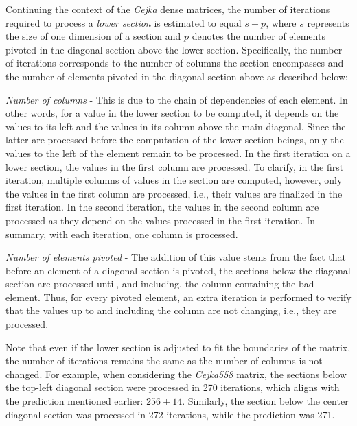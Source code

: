 Continuing the context of the \textit{Cejka} dense matrices, the number of iterations required to process a \textit{lower section} is estimated to equal $s + p$, where $s$ represents the size of one dimension of a section and $p$ denotes the number of elements pivoted in the diagonal section above the lower section.
Specifically, the number of iterations corresponds to the number of columns the section encompasses and the number of elements pivoted in the diagonal section above as described below:

\begin{tight_itemize}
	\item \textit{Number of columns} - This is due to the chain of dependencies of each element.
In other words, for a value in the lower section to be computed, it depends on the values to its left and the values in its column above the main diagonal.
Since the latter are processed before the computation of the lower section beings, only the values to the left of the element remain to be processed.
In the first iteration on a lower section, the values in the first column are processed.
To clarify, in the first iteration, multiple columns of values in the section are computed, however, only the values in the first column are processed, i.e., their values are finalized in the first iteration.
In the second iteration, the values in the second column are processed as they depend on the values processed in the first iteration.
In summary, with each iteration, one column is processed.
	\item \textit{Number of elements pivoted} - The addition of this value stems from the fact that before an element of a diagonal section is pivoted, the sections below the diagonal section are processed until, and including, the column containing the bad element.
Thus, for every pivoted element, an extra iteration is performed to verify that the values up to and including the column are not changing, i.e., they are processed.
\end{tight_itemize}

Note that even if the lower section is adjusted to fit the boundaries of the matrix, the number of iterations remains the same as the number of columns is not changed.
For example, when considering the \textit{Cejka558} matrix, the sections below the top-left diagonal section were processed in 270 iterations, which aligns with the prediction mentioned earlier: $256 + 14$.
Similarly, the section below the center diagonal section was processed in 272 iterations, while the prediction was 271.

